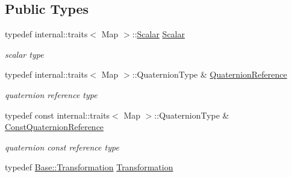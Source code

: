\subsection*{Public Types}
\begin{DoxyCompactItemize}
\item 
typedef internal\+::traits$<$ Map $>$\+::\hyperlink{class_sophus_1_1_s_o3_group_base_a31bf31815c195b7150da8a8e8c6f0189}{Scalar} \hyperlink{class_eigen_1_1_map_3_01_sophus_1_1_s_o3_group_3_01___scalar_01_4_00_01___options_01_4_a3847af0a5bb7bf1ae0d47c57b7aed2a5}{Scalar}\hypertarget{class_eigen_1_1_map_3_01_sophus_1_1_s_o3_group_3_01___scalar_01_4_00_01___options_01_4_a3847af0a5bb7bf1ae0d47c57b7aed2a5}{}\label{class_eigen_1_1_map_3_01_sophus_1_1_s_o3_group_3_01___scalar_01_4_00_01___options_01_4_a3847af0a5bb7bf1ae0d47c57b7aed2a5}

\begin{DoxyCompactList}\small\item\em scalar type \end{DoxyCompactList}\item 
typedef internal\+::traits$<$ Map $>$\+::Quaternion\+Type \& \hyperlink{class_eigen_1_1_map_3_01_sophus_1_1_s_o3_group_3_01___scalar_01_4_00_01___options_01_4_a86c67489696ba95023fc4c6ad5c616ef}{Quaternion\+Reference}\hypertarget{class_eigen_1_1_map_3_01_sophus_1_1_s_o3_group_3_01___scalar_01_4_00_01___options_01_4_a86c67489696ba95023fc4c6ad5c616ef}{}\label{class_eigen_1_1_map_3_01_sophus_1_1_s_o3_group_3_01___scalar_01_4_00_01___options_01_4_a86c67489696ba95023fc4c6ad5c616ef}

\begin{DoxyCompactList}\small\item\em quaternion reference type \end{DoxyCompactList}\item 
typedef const internal\+::traits$<$ Map $>$\+::Quaternion\+Type \& \hyperlink{class_eigen_1_1_map_3_01_sophus_1_1_s_o3_group_3_01___scalar_01_4_00_01___options_01_4_a164920d3a48953a81c8c0544bdeed46c}{Const\+Quaternion\+Reference}\hypertarget{class_eigen_1_1_map_3_01_sophus_1_1_s_o3_group_3_01___scalar_01_4_00_01___options_01_4_a164920d3a48953a81c8c0544bdeed46c}{}\label{class_eigen_1_1_map_3_01_sophus_1_1_s_o3_group_3_01___scalar_01_4_00_01___options_01_4_a164920d3a48953a81c8c0544bdeed46c}

\begin{DoxyCompactList}\small\item\em quaternion const reference type \end{DoxyCompactList}\item 
typedef \hyperlink{class_sophus_1_1_s_o3_group_base_aa20fc57bf1b355a6616f5c4b785f1fc5}{Base\+::\+Transformation} \hyperlink{class_eigen_1_1_map_3_01_sophus_1_1_s_o3_group_3_01___scalar_01_4_00_01___options_01_4_a34a03facbc8491b9ac83081eea2b369f}{Transformation}\hypertarget{class_eigen_1_1_map_3_01_sophus_1_1_s_o3_group_3_01___scalar_01_4_00_01___options_01_4_a34a03facbc8491b9ac83081eea2b369f}{}\label{class_eigen_1_1_map_3_01_sophus_1_1_s_o3_group_3_01___scalar_01_4_00_01___options_01_4_a34a03facbc8491b9ac83081eea2b369f}


\end{DoxyCompactItemize}
